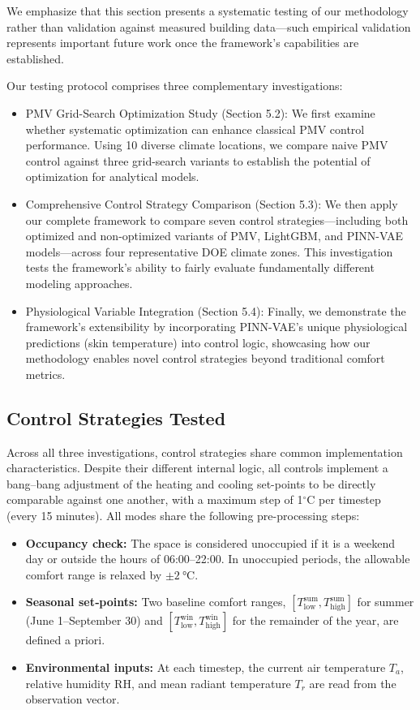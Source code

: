 We emphasize that this section presents a systematic testing of our methodology rather than validation against measured building data—such empirical validation represents important future work once the framework's capabilities are established.

Our testing protocol comprises three complementary investigations:
\begin{itemize}
    \item PMV Grid-Search Optimization Study (Section 5.2): We first examine whether systematic optimization can enhance classical PMV control performance. Using 10 diverse climate locations, we compare naive PMV control against three grid-search variants to establish the potential of optimization for analytical models.
    \item Comprehensive Control Strategy Comparison (Section 5.3): We then apply our complete framework to compare seven control strategies—including both optimized and non-optimized variants of PMV, LightGBM, and PINN-VAE models—across four representative DOE climate zones. This investigation tests the framework's ability to fairly evaluate fundamentally different modeling approaches.
    \item Physiological Variable Integration (Section 5.4): Finally, we demonstrate the framework's extensibility by incorporating PINN-VAE's unique physiological predictions (skin temperature) into control logic, showcasing how our methodology enables novel control strategies beyond traditional comfort metrics.
\end{itemize}

\subsection{Control Strategies Tested}
\label{sec:control_strategies}
Across all three investigations, control strategies share common implementation characteristics. Despite their different internal logic, all controls implement a bang–bang adjustment of the heating and cooling set-points to be directly comparable against one another, with a maximum step of 1$^\circ$C per timestep (every 15 minutes). All modes share the following pre-processing steps:

\begin{itemize}
  \item \textbf{Occupancy check:} The space is considered unoccupied if it is a weekend day or outside the hours of 06:00–22:00. In unoccupied periods, the allowable comfort range is relaxed by \(\pm\SI{2}{\degreeCelsius}\).
  \item \textbf{Seasonal set‐points:} Two baseline comfort ranges, \(\left[T_\mathrm{low}^\mathrm{sum},T_\mathrm{high}^\mathrm{sum}\right]\) for summer (June 1–September 30) and \(\left[T_\mathrm{low}^\mathrm{win},T_\mathrm{high}^\mathrm{win}\right]\) for the remainder of the year, are defined a priori.  
  \item \textbf{Environmental inputs:} At each timestep, the current air temperature \(T_a\), relative humidity RH, and mean radiant temperature \(T_r\) are read from the observation vector.  
\end{itemize}

